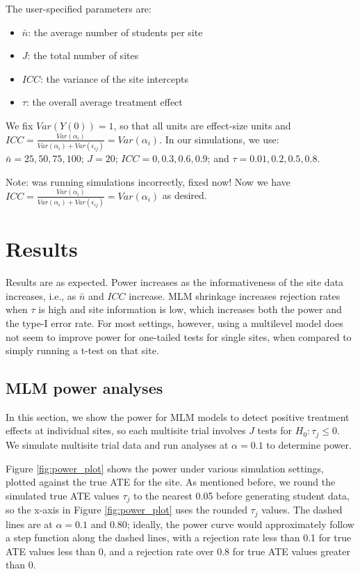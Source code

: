 \documentclass[]{article}
\begin{document}
The user-specified parameters are:
\begin{itemize}
	\item $\bar{n}$: the average number of students per site
	\item $J$: the total number of sites
	\item $ICC$: the variance of the site intercepts
	\item $\tau$: the overall average treatment effect
\end{itemize}
We fix $Var(Y(0)) = 1$, so that all units are effect-size units and $ICC = \frac{Var(\alpha_i)}{Var(\alpha_i) + Var(\epsilon_{ij})} = Var(\alpha_i)$.
In our simulations, we use: $\bar{n} = 25, 50, 75, 100$; $J = 20$; $ICC = 0, 0.3, 0.6, 0.9$; and $\tau = 0.01, 0.2, 0.5, 0.8$.

Note: was running simulations incorrectly, fixed now! 
Now we have $ICC = \frac{Var(\alpha_i)}{Var(\alpha_i) + Var(\epsilon_{ij})} = Var(\alpha_i)$ as desired.


\section{Results}

Results are as expected.
Power increases as the informativeness of the site data increases, i.e., as $\bar{n}$ and $ICC$ increase.
MLM shrinkage increases rejection rates when $\tau$ is high and site information is low, which increases both the power and the type-I error rate.
For most settings, however, using a multilevel model does not seem to improve power for one-tailed tests for single sites, when compared to simply running a t-test on that site.


\subsection{MLM power analyses}

In this section, we show the power for MLM models to detect positive treatment effects at individual sites, so each multisite trial involves $J$ tests for $H_0: \tau_j \leq 0$.
We simulate multisite trial data and run  analyses at $\alpha = 0.1$ to determine power.

Figure \ref{fig:power_plot} shows the power under various simulation settings, plotted against the true ATE for the site.
As mentioned before, we round the simulated true ATE values $\tau_j$ to the nearest 0.05 before generating student data, so the x-axis in Figure \ref{fig:power_plot} uses the rounded $\tau_j$ values.
The dashed lines are at $\alpha = 0.1$ and $0.80$; ideally, the power curve would approximately follow a step function along the dashed lines, with a rejection rate less than 0.1 for true ATE values less than 0, and a rejection rate over 0.8 for true ATE values greater than 0.
\end{document}
